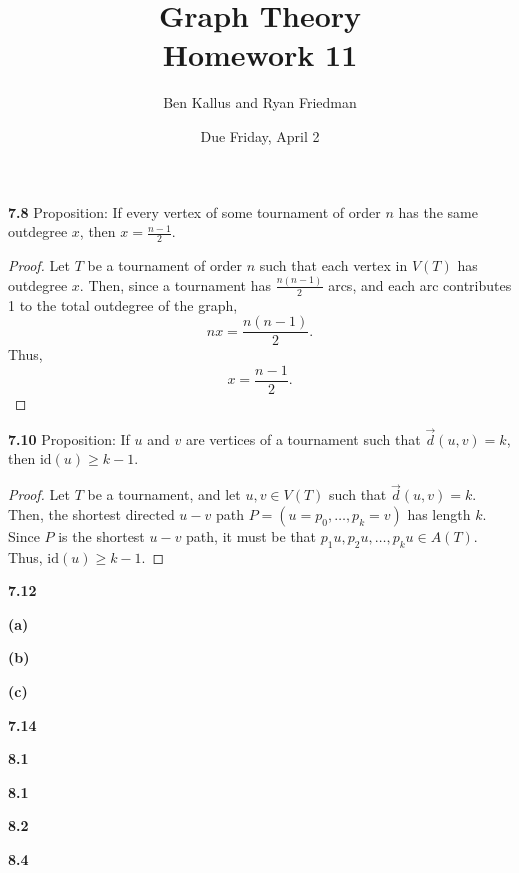 \documentclass[12pt]{article}
\title{Graph Theory \\ Homework 11}
\author{Ben Kallus and Ryan Friedman}
\date{Due Friday, April 2}
\newcommand{\id}{\text{id}}
\begin{document}
\maketitle

\noindent\textbf{7.8} Proposition: If every vertex of some tournament of order $n$ has the same outdegree $x$, then $x = \frac{n-1}2$.
\begin{proof}
	Let $T$ be a tournament of order $n$ such that each vertex in $V(T)$ has outdegree $x$.
	Then, since a tournament has $\frac{n(n-1)}2$ arcs, and each arc contributes 1 to the total outdegree of the graph, $$nx = \frac{n(n-1)}2.$$
	Thus, $$x = \frac{n-1}2.$$
\end{proof}

\newpage\noindent\textbf{7.10} Proposition: If $u$ and $v$ are vertices of a tournament such that $\vec{d}(u,v) = k$, then $\id(u) \geq k - 1$.
\begin{proof}
	Let $T$ be a tournament, and let $u,v \in V(T)$ such that $\vec d(u,v) = k$.
	Then, the shortest directed $u-v$ path $P = (u = p_0, \hdots, p_k = v)$ has length $k$.
	Since $P$ is the shortest $u-v$ path, it must be that $p_1u, p_2u, \hdots, p_ku \in A(T)$.
	Thus, $\id(u) \geq k-1$.
\end{proof}
	

\newpage\noindent\textbf{7.12}

\textbf{(a)}

	

\textbf{(b)}



\textbf{(c)}
	

\newpage\noindent\textbf{7.14}

	

\newpage\noindent\textbf{8.1}

	

\newpage\noindent\textbf{8.1}

	

\newpage\noindent\textbf{8.2}

	

\newpage\noindent\textbf{8.4}

	
\end{document}

